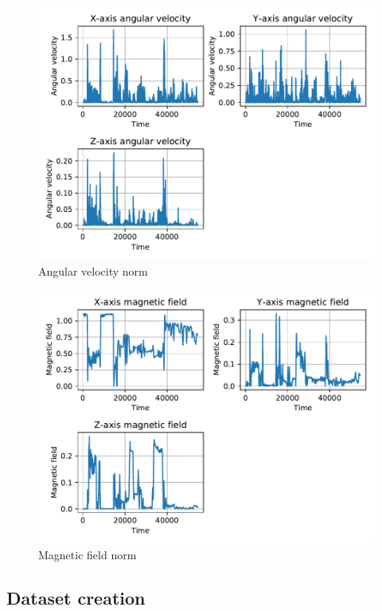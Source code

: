 \begin{figure}[htp]
\includegraphics[scale=0.55]{angular_velocity_susanna.pdf}
\caption{Angular velocity norm}
\label{fig:gyr}
\end{figure}

\begin{figure}[htp]
\includegraphics[scale=0.55]{magnetic_field_susanna.pdf}
\caption{Magnetic field norm}
\label{fig:mag}
\end{figure}


\subsection{Dataset creation}

